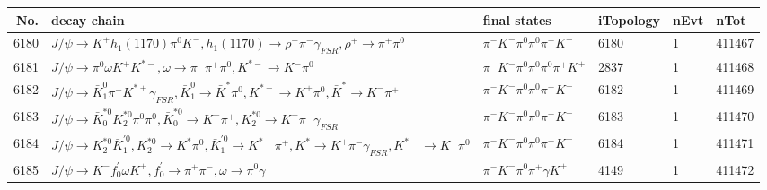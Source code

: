 \begin{table}[htbp] 
\begin{center}
\begin{small}
\begin{tabular}{rlllll}\hline\hline
 No. & decay chain & final states &  iTopology & nEvt & nTot \\\hline
6180&$J/\psi       \rightarrow K^{+}          h_{1}(1170)    \pi^{0}        K^{-}          , h_{1}(1170)     \rightarrow \rho^{+}      \pi^{-}        \gamma_{FSR} , \rho^{+}       \rightarrow \pi^{+}        \pi^{0}        $&$\pi^{-}        K^{-}          \pi^{0}        \pi^{0}        \pi^{+}        K^{+}          $& 6180&    1&411467\\
6181&$J/\psi       \rightarrow \pi^{0}        \omega         K^{+}          K^{*-}         , \omega          \rightarrow \pi^{-}        \pi^{+}        \pi^{0}        , K^{*-}          \rightarrow K^{-}          \pi^{0}        $&$\pi^{-}        K^{-}          \pi^{0}        \pi^{0}        \pi^{0}        \pi^{+}        K^{+}          $& 2837&    1&411468\\
6182&$J/\psi       \rightarrow \bar{K}_1^{0} \pi^{-}        K^{*+}         \gamma_{FSR} , \bar{K}_1^{0}  \rightarrow \bar{K}^{*}   \pi^{0}        , K^{*+}          \rightarrow K^{+}          \pi^{0}        , \bar{K}^{*}    \rightarrow K^{-}          \pi^{+}        $&$\pi^{-}        K^{-}          \pi^{0}        \pi^{0}        \pi^{+}        K^{+}          $& 6182&    1&411469\\
6183&$J/\psi       \rightarrow \bar{K}_0^{*0}K_2^{*0}       \pi^{0}        \pi^{0}        , \bar{K}_0^{*0} \rightarrow K^{-}          \pi^{+}        , K_2^{*0}        \rightarrow K^{+}          \pi^{-}        \gamma_{FSR} $&$\pi^{-}        K^{-}          \pi^{0}        \pi^{0}        \pi^{+}        K^{+}          $& 6183&    1&411470\\
6184&$J/\psi       \rightarrow K_2^{*0}       \bar{K}_1^{'0}, K_2^{*0}        \rightarrow K^{*}          \pi^{0}        , \bar{K}_1^{'0} \rightarrow K^{*-}         \pi^{+}        , K^{*}           \rightarrow K^{+}          \pi^{-}        \gamma_{FSR} , K^{*-}          \rightarrow K^{-}          \pi^{0}        $&$\pi^{-}        K^{-}          \pi^{0}        \pi^{0}        \pi^{+}        K^{+}          $& 6184&    1&411471\\
6185&$J/\psi       \rightarrow K^{-}          f^{'}_{0}     \omega         K^{+}          , f^{'}_{0}      \rightarrow \pi^{+}        \pi^{-}        , \omega          \rightarrow \pi^{0}        \gamma       $&$\pi^{-}        K^{-}          \pi^{0}        \pi^{+}        \gamma       K^{+}          $& 4149&    1&411472\\

\end{tabular}
\end{small}
\end{center}
\end{table}
